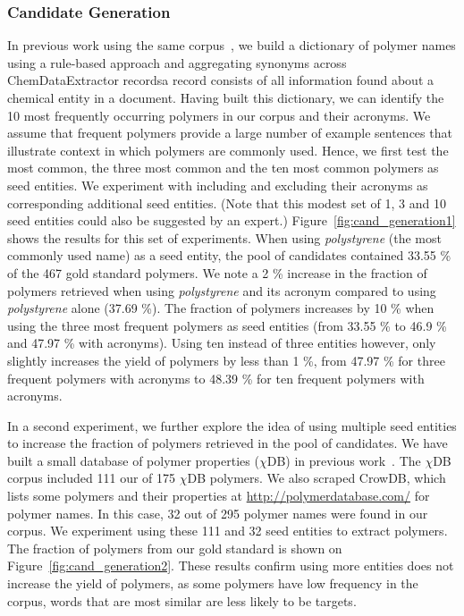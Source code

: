 \subsubsection{Candidate Generation}
In previous work using the same corpus~\cite{tchoua2016hybrid,tchoua2016hybridi}, we build a dictionary of polymer names using a rule-based approach and aggregating synonyms across ChemDataExtractor records\textemdash a record consists of all information found about a chemical entity in a document.  
Having built this dictionary, we can identify the 10 most frequently occurring polymers in our corpus and their acronyms.
We assume that frequent polymers provide a large number of example sentences that illustrate context in which polymers are commonly used.
Hence, we first test the most common, the three most common and the ten most common polymers as seed entities.
We experiment with including and excluding their acronyms as corresponding additional seed entities.
(Note that this modest set of 1, 3 and 10 seed entities could also be suggested by an expert.)
Figure~\ref{fig:cand_generation1} shows the results for this set of experiments.
When using \textit{polystyrene} (the most commonly used name) as a seed entity, the pool of candidates contained 33.55 \% of the 467 gold standard polymers.
We note a 2 \% increase in the fraction of polymers retrieved when using \textit{polystyrene} and its acronym compared to using \textit{polystyrene} alone (37.69 \%).
The fraction of polymers increases by 10 \% when using the three most frequent polymers as seed entities (from 33.55 \% to 46.9 \% and 47.97 \% with acronyms). 
Using ten instead of three entities however, only slightly increases the yield of polymers by less than 1 \%, from 47.97 \% for three frequent polymers with acronyms to 48.39 \% for ten frequent polymers with acronyms.

In a second experiment, we further explore the idea of using multiple seed entities to increase the fraction of polymers retrieved in the pool of candidates.
We have built a small database of polymer properties ($\chi$DB) in previous work~\cite{choua2016hybrid,tchoua2016hybridi}. 
The $\chi$DB corpus included 111 our of 175 $\chi$DB polymers. 
We also scraped CrowDB, which lists some polymers and their properties at \url{http://polymerdatabase.com/} for polymer names.  
In this case, 32 out of 295 polymer names were found in our corpus.
We experiment using these 111 and 32 seed entities to extract polymers. The fraction of polymers from our gold standard is shown on Figure~\ref{fig:cand_generation2}.
These results confirm using more entities does not increase the yield of polymers, as some polymers have low frequency in the corpus, words that are most similar are less likely to be targets.

